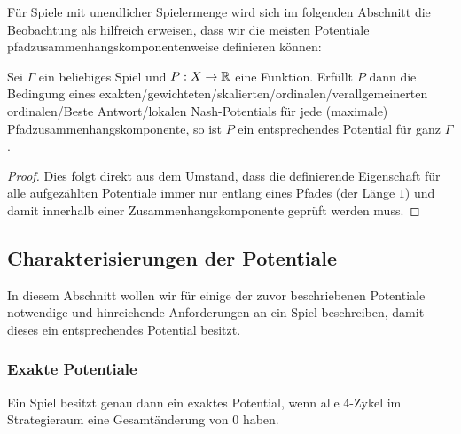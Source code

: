 Für Spiele mit unendlicher Spielermenge wird sich im folgenden Abschnitt die Beobachtung als hilfreich erweisen, dass wir die meisten Potentiale pfadzusammenhangskomponentenweise definieren können:

\begin{beob}\label{beob:KompWeisePotentiale}
	Sei $\Gamma$ ein beliebiges Spiel und $P: X \to \mathbb{R}$ eine Funktion. Erfüllt $P$ dann die Bedingung eines exakten/gewichteten/skalierten/ordinalen/verallgemeinerten ordinalen/Beste Antwort/lokalen Nash-Potentials für jede (maximale) Pfadzusammenhangskomponente, so ist $P$ ein entsprechendes Potential für ganz $\Gamma$.
\end{beob}

\begin{proof}
	Dies folgt direkt aus dem Umstand, dass die definierende Eigenschaft für alle aufgezählten Potentiale immer nur entlang eines Pfades (der Länge $1$) und damit innerhalb einer Zusammenhangskomponente geprüft werden muss.
\end{proof}


\subsection{Charakterisierungen der Potentiale}

In diesem Abschnitt wollen wir für einige der zuvor beschriebenen Potentiale notwendige und hinreichende Anforderungen an ein Spiel beschreiben, damit dieses ein entsprechendes Potential besitzt.

\subsubsection{Exakte Potentiale}

\begin{satz}\label{satz:CharExPot}
	Ein Spiel besitzt genau dann ein exaktes Potential, wenn alle 4-Zykel im Strategieraum eine Gesamtänderung von $0$ haben.
\end{satz}

